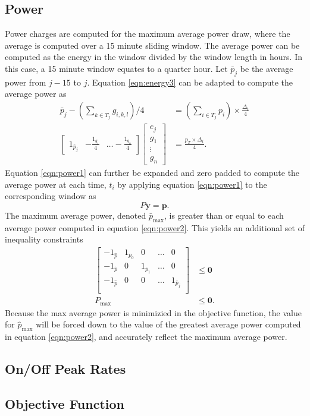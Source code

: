 \subsection{Power}
Power charges are computed for the maximum average power draw, where the average is computed over a 15 minute sliding window. The average power can be computed as the energy in the window divided by the window length in hours. In this case, a 15 minute window equates to a quarter hour. Let $\bar{p}_j$ be the average power from $j - 15$ to $j$. Equation \ref{eqn:energy3} can be adapted to compute the average power as
\begin{equation}\label{eqn:power1} 
	\begin{aligned}
		\bar{p}_j - \left ( \sum_{k\in T_j}g_{i,k,l} \right )/4 &= \left ( \sum_{i\in T_j}p_i \right ) \times \frac{\Delta_t}{4} \\
		\begin{bmatrix} 1_{\bar{p}_j} & -\frac{1_{g_1}}{4} & \hdots -\frac{1_{g_n}}{4} \end{bmatrix} \begin{bmatrix}e_j \\ g_1 \\ \vdots \\ g_n \end{bmatrix} &= \frac{p_T \times \Delta_t}{4}.
	\end{aligned}
\end{equation}
Equation \ref{eqn:power1} can further be expanded and zero padded to compute the average power at each time, $t_i$ by applying equation \ref{eqn:power1} to the corresponding window as
\begin{equation}\label{eqn:power2}
	P\mathbf{y} = \mathbf{p}.	
\end{equation}
The maximum average power, denoted $\bar{p}_{\text{max}}$, is greater than or equal to each average power computed in equation \ref{eqn:power2}.  This yields an additional set of inequality constraints 
\begin{equation}
	\begin{aligned}
		 \begin{bmatrix} 
		-1_{\hat{p}} & 1_{p_0} & 0             & \hdots & 0 \\ 
	        -1_{\hat{p}} & 0       & 1_{\bar{p}_1} & \hdots & 0\\
		-1_{\hat{p}} & 0       & 0 & \hdots    & 1_{\bar{p}_j} \\
		 \end{bmatrix} &\le \mathbf{0} \\ 
		 P_{\text{max}} &\le \mathbf{0}.
	\end{aligned}
\end{equation}
Because the max average power is minimizied in the objective function, the value for $\hat{p}_{\text{max}}$ will be forced down to the value of the greatest average power computed in equation \ref{eqn:power2}, and accurately reflect the maximum average power.
\subsection{On/Off Peak Rates}

\subsection{Objective Function}

